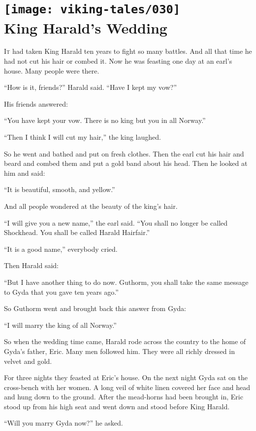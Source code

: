 \section[King Harald's Wedding]{
    \texttt{[image: viking-tales/030]}\\
    King Harald's Wedding}

\lettrine{I}{t} had taken King Harald ten years to fight so many battles.
And all that time he had not cut his hair or combed it. Now he was
feasting one day at an earl's house. Many people were there.

``How is it, friends?'' Harald said. ``Have I kept my vow?''

His friends answered:

``You have kept your vow. There is no king but you in all Norway.''

``Then I think I will cut my hair,'' the king laughed.

So he went and bathed and put on fresh clothes. Then the earl cut his
hair and beard and combed them and put a gold band about his head. Then
he looked at him and said:

``It is beautiful, smooth, and yellow.''

And all people wondered at the beauty of the king's hair.

``I will give you a new name,'' the earl said. ``You shall no longer be
called Shockhead. You shall be called Harald Hairfair.''

``It is a good name,'' everybody cried.

Then Harald said:

``But I have another thing to do now. Guthorm, you shall take the same
message to Gyda that you gave ten years ago.''

So Guthorm went and brought back this answer from Gyda:

``I will marry the king of all Norway.''

So when the wedding time came, Harald rode across the country to the
home of Gyda's father, Eric. Many men followed him. They were all richly
dressed in velvet and gold.

For three nights they feasted at Eric's house. On the next night Gyda
sat on the cross-bench with her women. A long veil of white linen
covered her face and head and hung down to the ground. After the
mead-horns had been brought in, Eric stood up from his high seat and
went down and stood before King Harald.

``Will you marry Gyda now?'' he asked.

